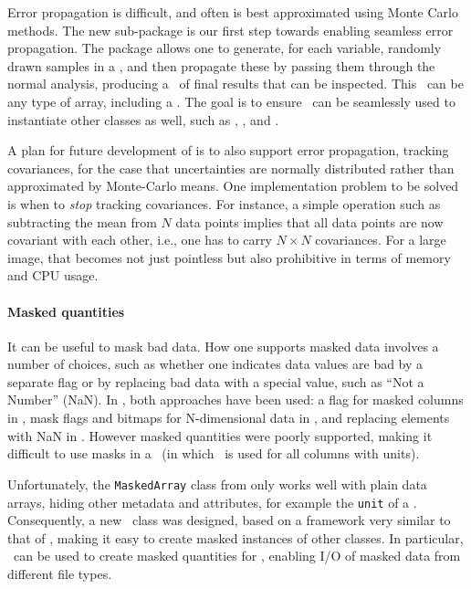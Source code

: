 \documentclass[modern]{aastex631}
\begin{document}
Error propagation is difficult, and often is best approximated using Monte Carlo
methods. The new  sub-package is our first step
towards enabling seamless error propagation. The package allows one to
generate, for each variable, randomly drawn samples in a \astropyDistribution,
and then propagate these by passing them through the normal analysis, producing
a \astropyDistribution\ of final results that can be inspected. This
\astropyDistribution\ can be any type of array, including a \astropyQuantity.
The goal is to ensure \astropyDistribution\ can be seamlessly used to
instantiate other \astropypkg classes as well, such as \astropySkyCoord,
\astropyTime, and \astropyCosmology.

A plan for future development of  is to also
support error propagation, tracking covariances, for the case that uncertainties
are normally distributed rather than approximated by Monte-Carlo means. One
implementation problem to be solved is when to {\em stop} tracking covariances.
For instance, a simple operation such as subtracting the mean from $N$ data
points implies that all data points are now covariant with each other, i.e., one
has to carry $N\times N$ covariances. For a large image, that becomes not just
pointless but also prohibitive in terms of memory and CPU usage.

\paragraph{Masked quantities}  It can be useful to mask bad data. How one
supports masked data involves a number of choices, such as whether one indicates
data values are bad by a separate flag or by replacing bad data with a special
value, such as ``Not a Number'' (NaN). In \astropypkg, both approaches have
been used: a flag for masked columns in \astropyTable, mask flags and bitmaps
for N-dimensional data in , and replacing elements with
NaN in \astropyTime. However masked quantities were poorly supported, making it
difficult to use masks in a \astropyQTable\ (in which \astropyQuantity\ is used
for all columns with units).

Unfortunately, the \texttt{MaskedArray} class from  only works
well with plain data arrays, hiding other metadata and attributes, for example
the \texttt{unit} of a \astropyQuantity. Consequently, a new \astropyMasked\
class was designed, based on a framework very similar to that of
\astropyDistribution, making it easy to create masked instances of other
classes. In particular, \astropyMasked\ can be used to create masked quantities
for \astropyQTable, enabling I/O of masked data from different file types.
\end{document}
